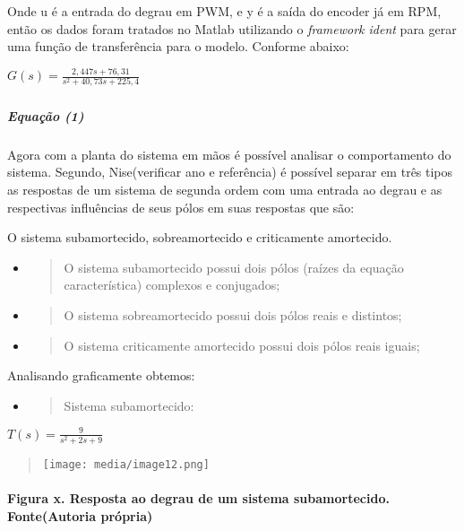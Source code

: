 \documentclass[]{article}
\let\oldparagraph\paragraph
\renewcommand{\paragraph}[1]{\oldparagraph{#1}\mbox{}}
\let\oldsubparagraph\subparagraph
\renewcommand{\subparagraph}[1]{\oldsubparagraph{#1}\mbox{}}
\begin{document}
Onde u é a entrada do degrau em PWM, e y é a saída do encoder já em RPM,
então os dados foram tratados no Matlab utilizando o \emph{framework
ident} para gerar uma função de transferência para o modelo. Conforme
abaixo:

\(G(s) = \frac{2,447s + 76,31}{s^{2} + 40,73s + 225,4}\)

\subparagraph{}\label{section}

\subparagraph{Equação (1)}\label{equauxe7uxe3o-1}

Agora com a planta do sistema em mãos é possível analisar o
comportamento do sistema. Segundo, Nise(verificar ano e referência) é
possível separar em três tipos as respostas de um sistema de segunda
ordem com uma entrada ao degrau e as respectivas influências de seus
pólos em suas respostas que são:

O sistema subamortecido, sobreamortecido e criticamente amortecido.

\begin{itemize}
\item
  \begin{quote}
  O sistema subamortecido possui dois pólos (raízes da equação
  característica) complexos e conjugados;
  \end{quote}
\item
  \begin{quote}
  O sistema sobreamortecido possui dois pólos reais e distintos;
  \end{quote}
\item
  \begin{quote}
  O sistema criticamente amortecido possui dois pólos reais iguais;
  \end{quote}
\end{itemize}

Analisando graficamente obtemos:

\begin{itemize}
\item
  \begin{quote}
  Sistema subamortecido:
  \end{quote}
\end{itemize}

\(T(s) = \frac{9}{s^{2} + 2s + 9}\)

\begin{quote}
\texttt{[image: media/image12.png]}
\end{quote}

\paragraph{ Figura x. Resposta ao degrau de um sistema subamortecido.
Fonte(Autoria
própria)}\label{figura-x.-resposta-ao-degrau-de-um-sistema-subamortecido.-fonteautoria-pruxf3pria}
\end{document}

